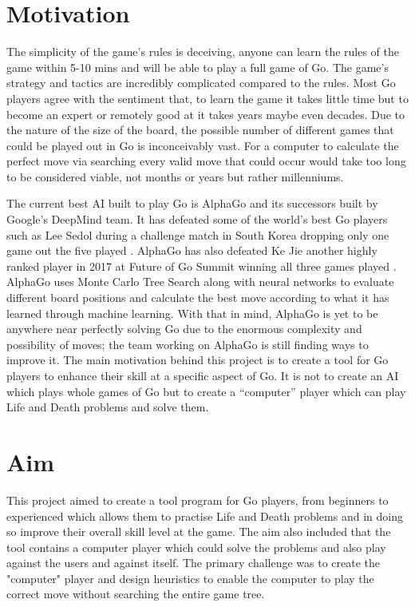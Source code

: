 \documentclass{l4proj}
\begin{document}
\section{Motivation}
The simplicity of the game's rules is deceiving, anyone can learn the rules of the game within 5-10 mins and will be able to play a full game of Go. The game's strategy and tactics are incredibly complicated compared to the rules. Most Go players agree with the sentiment that, to learn the game it takes little time but to become an expert or remotely good at it takes years maybe even decades. Due to the nature of the size of the board, the possible number of different games that could be played out in Go is inconceivably vast. For a computer to calculate the perfect move via searching every valid move that could occur would take too long to be considered viable, not months or years but rather millenniums.

The current best AI built to play Go is AlphaGo \citep{AlphaGo} and its successors built by Google’s DeepMind team. It has defeated some of the world’s best Go players such as Lee Sedol during a challenge match in South Korea dropping only one game out the five played \citep{AlphaGoLeeSedol}. AlphaGo has also defeated Ke Jie another highly ranked player in 2017 at Future of Go Summit winning all three games played \citep{AlphaGoKeJie}. AlphaGo uses Monte Carlo Tree Search along with neural networks to evaluate different board positions and calculate the best move according to what it has learned through machine learning. With that in mind, AlphaGo is yet to be anywhere near perfectly solving Go due to the enormous complexity and possibility of moves; the team working on AlphaGo is still finding ways to improve it.
The main motivation behind this project is to create a tool for Go players to enhance their skill at a specific aspect of Go. It is not to create an AI which plays whole games of Go but to create a “computer” player which can play Life and Death problems and solve them.


\section{Aim}
This project aimed to create a tool program for Go players, from beginners to experienced which allows them to practise Life and Death problems and in doing so improve their overall skill level at the game.  The aim also included that the tool contains a computer player which could solve the problems and also play against the users and against itself. The primary challenge was to create the  "computer" player and design heuristics to enable the computer to play the correct move without searching the entire game tree.
\end{document}
